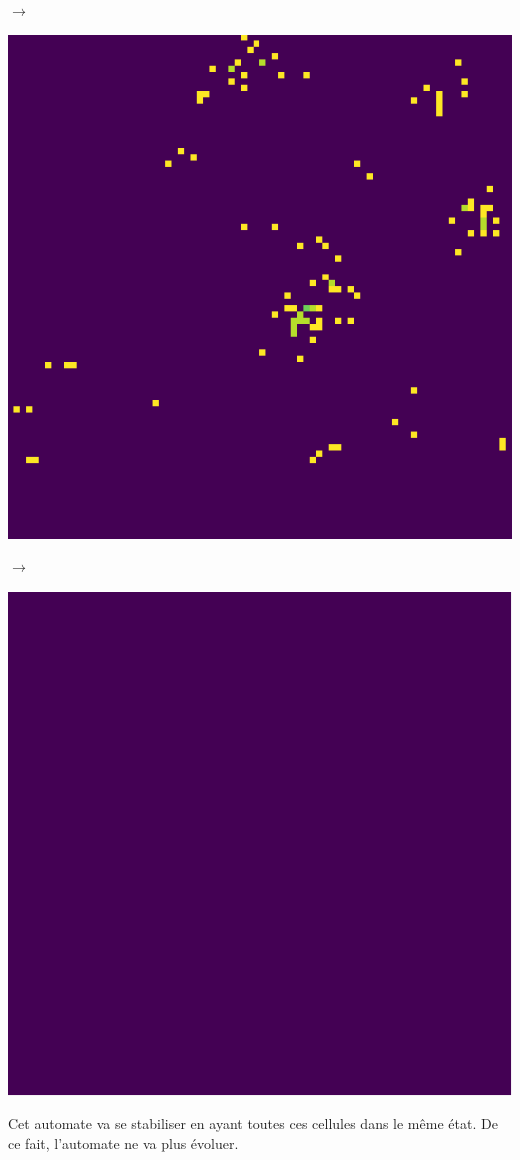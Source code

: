 \documentclass[12pt, a4paper]{article}
\begin{document}
\begin{center}
\begin{minipage}{.17\linewidth}
                \end{minipage}
                $\rightarrow$
                \begin{minipage}{.17\linewidth}
                    \includegraphics[scale=0.15]{img/part3/2/step3.png}
                \end{minipage}
                $\rightarrow$
                \begin{minipage}{.17\linewidth}
                    \includegraphics[scale=0.15]{img/part3/2/step4.png}
                \end{minipage}
            \end{center}
            Cet automate va se stabiliser en ayant toutes ces cellules dans le même état. De ce fait, l'automate ne va plus évoluer.
\end{document}
